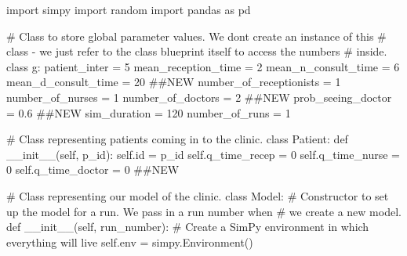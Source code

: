 \documentclass[
  letterpaper,
  DIV=11,
  numbers=noendperiod]{scrreprt}
\newenvironment{Shaded}{\begin{snugshade}}{\end{snugshade}}
\newcommand{\BuiltInTok}[1]{\textcolor[rgb]{0.00,0.23,0.31}{#1}}
\newcommand{\CommentTok}[1]{\textcolor[rgb]{0.37,0.37,0.37}{#1}}
\newcommand{\DecValTok}[1]{\textcolor[rgb]{0.68,0.00,0.00}{#1}}
\newcommand{\FloatTok}[1]{\textcolor[rgb]{0.68,0.00,0.00}{#1}}
\newcommand{\FunctionTok}[1]{\textcolor[rgb]{0.28,0.35,0.67}{#1}}
\newcommand{\ImportTok}[1]{\textcolor[rgb]{0.00,0.46,0.62}{#1}}
\newcommand{\KeywordTok}[1]{\textcolor[rgb]{0.00,0.23,0.31}{#1}}
\newcommand{\NormalTok}[1]{\textcolor[rgb]{0.00,0.23,0.31}{#1}}
\newcommand{\OperatorTok}[1]{\textcolor[rgb]{0.37,0.37,0.37}{#1}}
\newcommand{\VariableTok}[1]{\textcolor[rgb]{0.07,0.07,0.07}{#1}}
\begin{document}
\begin{tcolorbox}[enhanced jigsaw, rightrule=.15mm, colback=white, colframe=quarto-callout-note-color-frame, colbacktitle=quarto-callout-note-color!10!white, toprule=.15mm, coltitle=black, opacityback=0, titlerule=0mm, bottomtitle=1mm, breakable, title=\textcolor{quarto-callout-note-color}{\faInfo}\hspace{0.5em}{Click here to view the code}, opacitybacktitle=0.6, toptitle=1mm, arc=.35mm, bottomrule=.15mm, leftrule=.75mm, left=2mm]

\begin{Shaded}
\begin{Highlighting}[]
\ImportTok{import}\NormalTok{ simpy}
\ImportTok{import}\NormalTok{ random}
\ImportTok{import}\NormalTok{ pandas }\ImportTok{as}\NormalTok{ pd}

\CommentTok{\# Class to store global parameter values.  We don\textquotesingle{}t create an instance of this}
\CommentTok{\# class {-} we just refer to the class blueprint itself to access the numbers}
\CommentTok{\# inside.}
\KeywordTok{class}\NormalTok{ g:}
\NormalTok{    patient\_inter }\OperatorTok{=} \DecValTok{5}
\NormalTok{    mean\_reception\_time }\OperatorTok{=} \DecValTok{2}
\NormalTok{    mean\_n\_consult\_time }\OperatorTok{=} \DecValTok{6}
\NormalTok{    mean\_d\_consult\_time }\OperatorTok{=} \DecValTok{20} \CommentTok{\#\#NEW}
\NormalTok{    number\_of\_receptionists }\OperatorTok{=} \DecValTok{1}
\NormalTok{    number\_of\_nurses }\OperatorTok{=} \DecValTok{1}
\NormalTok{    number\_of\_doctors }\OperatorTok{=} \DecValTok{2} \CommentTok{\#\#NEW}
\NormalTok{    prob\_seeing\_doctor }\OperatorTok{=} \FloatTok{0.6} \CommentTok{\#\#NEW}
\NormalTok{    sim\_duration }\OperatorTok{=} \DecValTok{120}
\NormalTok{    number\_of\_runs }\OperatorTok{=} \DecValTok{1}

\CommentTok{\# Class representing patients coming in to the clinic.}
\KeywordTok{class}\NormalTok{ Patient:}
    \KeywordTok{def} \FunctionTok{\_\_init\_\_}\NormalTok{(}\VariableTok{self}\NormalTok{, p\_id):}
        \VariableTok{self}\NormalTok{.}\BuiltInTok{id} \OperatorTok{=}\NormalTok{ p\_id}
        \VariableTok{self}\NormalTok{.q\_time\_recep }\OperatorTok{=} \DecValTok{0}
        \VariableTok{self}\NormalTok{.q\_time\_nurse }\OperatorTok{=} \DecValTok{0}
        \VariableTok{self}\NormalTok{.q\_time\_doctor }\OperatorTok{=} \DecValTok{0} \CommentTok{\#\#NEW}

\CommentTok{\# Class representing our model of the clinic.}
\KeywordTok{class}\NormalTok{ Model:}
    \CommentTok{\# Constructor to set up the model for a run.  We pass in a run number when}
    \CommentTok{\# we create a new model.}
    \KeywordTok{def} \FunctionTok{\_\_init\_\_}\NormalTok{(}\VariableTok{self}\NormalTok{, run\_number):}
        \CommentTok{\# Create a SimPy environment in which everything will live}
        \VariableTok{self}\NormalTok{.env }\OperatorTok{=}\NormalTok{ simpy.Environment()}


\end{Highlighting}
\end{Shaded}
\end{tcolorbox}
\end{document}
